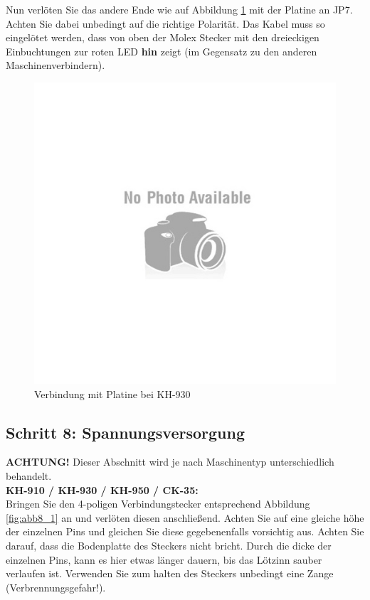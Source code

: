 \documentclass[fleqn,10pt]{SelfArx} %
\begin{document}
Nun verlöten Sie das andere Ende wie auf Abbildung \ref{fig:abb7_8} mit der Platine an JP7. Achten Sie dabei unbedingt auf die richtige Polarität. Das Kabel muss so eingelötet werden, dass von oben der Molex Stecker mit den dreieckigen Einbuchtungen zur roten LED \textbf{hin} zeigt (im Gegensatz zu den anderen Maschinenverbindern).

\begin{figure}[tbhp]\centering
\includegraphics[width=\linewidth]{no}
\caption{Verbindung mit Platine bei KH-930}
\label{fig:abb7_8}
\end{figure}

\FloatBarrier

 \subsection*{Schritt 8: Spannungsversorgung}

\textbf{ACHTUNG!} Dieser Abschnitt wird je nach Maschinentyp unterschiedlich behandelt.\\

\textbf{KH-910 / KH-930 / KH-950 / CK-35:} \\

Bringen Sie den 4-poligen Verbindungstecker entsprechend Abbildung \ref{fig:abb8_1} an und verlöten diesen anschließend. Achten Sie auf eine gleiche höhe der einzelnen Pins und gleichen Sie diese gegebenenfalls vorsichtig aus. Achten Sie darauf, dass die Bodenplatte des Steckers nicht bricht. Durch die dicke der einzelnen Pins, kann es hier etwas länger dauern, bis das Lötzinn sauber verlaufen ist. Verwenden Sie zum halten des Steckers unbedingt eine Zange (Verbrennungsgefahr!).
\end{document}
